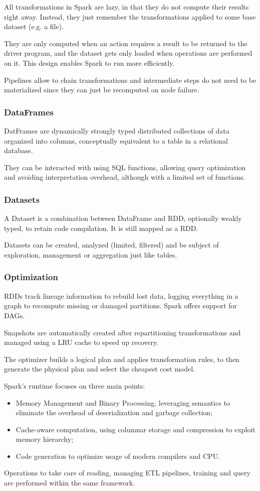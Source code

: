 All transformations in Spark are lazy, in that they do not compute their results right away. Instead, they just remember the transformations applied to some base dataset (e.g. a file). 

They are only computed when an action requires a result to be returned to the driver program, and the dataset gets only loaded when operations are performed on it. This design enables Spark to run more efficiently.

Pipelines allow to chain transformations and intermediate steps do not need to be materialized since they can just be recomputed on node failure.

\subsubsection{DataFrames}
DatFrames are dynamically strongly typed distributed collections of data organized into columns, conceptually equivalent to a table in a relational database.

They can be interacted with using SQL functions, allowing query optimization and avoiding interpretation overhead, although with a limited set of functions.

\subsubsection{Datasets}
A Dataset is a combination between DataFrame and RDD, optionally weakly typed, to retain code compilation. It is still mapped as a RDD.

Datasets can be created, analyzed (limited, filtered) and be subject of exploration, management or aggregation just like tables.

\subsubsection{Optimization}
RDDs track lineage information to rebuild lost data, logging everything in a graph to recompute missing or damaged partitions. Spark offers support for DAGs.

Snapshots are automatically created after repartitioning transformations and managed using a LRU cache to speed up recovery.

The optimizer builds a logical plan and applies transformation rules, to then generate the physical plan and select the cheapest cost model. 

Spark's runtime focuses on three main points:
\begin{itemize}
	\item Memory Management and Binary Processing, leveraging semantics to eliminate the overhead of deserialization and garbage collection;
	\item Cache-aware computation, using columnar storage and compression to exploit memory hierarchy;
	\item Code generation to optimize usage of modern compilers and CPU.
\end{itemize}

Operations to take care of reading, managing ETL pipelines, training and query are performed within the same framework.
